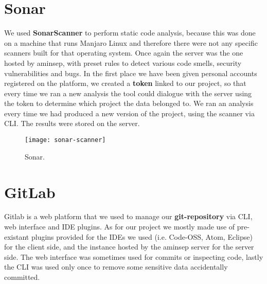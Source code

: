 \documentclass[a4paper,10pt]{report}
\begin{document}
\section{Sonar}
We used \textbf{SonarScanner} to perform static code analysis, because this was done on a machine that runs Manjaro Linux and therefore there were not any specific scanners built for that operating system. Once again the server was the one hosted by aminsep, with preset rules to detect various code smells, security vulnerabilities and bugs. 
In the first place we have been given personal accounts registered on the platform, we created a \textbf{token} linked to our project, so that every time we ran a new analysis the tool could dialogue with the server using the token to determine which project the data belonged to.
We ran an analysis every time we had produced a new version of the project, using the scanner via CLI. The results were stored on the server.

\begin{figure}[H]
	\centering
    \texttt{[image: sonar-scanner]}
    \caption{Sonar.}
    \label{fig:sonar}
\end{figure}
\section[GitLab] {GitLab}
Gitlab is a web platform that we used to manage our \textbf{git-repository} via CLI, web interface and IDE plugins.
As for our project we mostly made use of pre-existant plugins provided for the IDEs we used (i.e. Code-OSS, Atom, Eclipse) for the client side, and the instance hosted by the aminsep server for the server side. The web interface was sometimes used for commits or inspecting code, lastly the CLI was used only once to remove some sensitive data accidentally committed.
\end{document}
